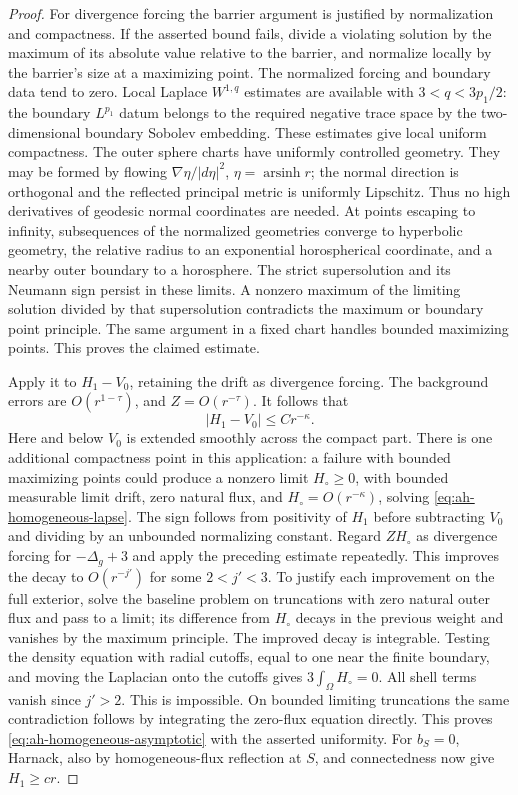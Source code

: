 \begin{proof}
For divergence forcing the barrier argument is justified by
normalization and compactness.  If the asserted bound fails,
divide a violating solution by the maximum of its absolute
value relative to the barrier, and normalize locally by the
barrier's size at a maximizing point.  The normalized forcing
and boundary data tend to zero.  Local Laplace \(W^{1,q}\)
estimates are available with
\(3<q<3p_1/2\): the boundary \(L^{p_1}\) datum belongs to the
required negative trace space by the two-dimensional boundary
Sobolev embedding.  These estimates give local uniform compactness.
The outer sphere charts have uniformly controlled geometry.
They may be formed by flowing
\(\nabla\eta/|d\eta|^2\), \(\eta=\operatorname{arsinh}r\);
the normal direction is orthogonal and the reflected principal
metric is uniformly Lipschitz.  Thus no high derivatives of
geodesic normal coordinates are needed.
At points escaping to infinity, subsequences of the normalized
geometries converge to hyperbolic geometry, the relative radius
to an exponential horospherical coordinate, and a nearby outer
boundary to a horosphere.  The strict supersolution and its
Neumann sign persist in these limits.  A nonzero maximum of the
limiting solution divided by that supersolution contradicts the
maximum or boundary point principle.  The same argument in a
fixed chart handles bounded maximizing points.  This proves the
claimed estimate.

Apply it to \(H_1-V_0\), retaining the drift as divergence forcing.
The background errors are \(O(r^{1-\tau})\), and
\(Z=O(r^{-\tau})\).  It follows that
\begin{equation}\label{eq:ah-homogeneous-asymptotic}
 |H_1-V_0|\le Cr^{-\kappa}.
\end{equation}
Here and below \(V_0\) is extended smoothly across the compact
part.  There is one additional compactness point in this
application: a failure with bounded maximizing points could
produce a nonzero limit \(H_\circ\ge0\), with bounded measurable
limit drift, zero natural flux, and
\(H_\circ=O(r^{-\kappa})\), solving
\eqref{eq:ah-homogeneous-lapse}.  The sign follows from positivity
of \(H_1\) before subtracting \(V_0\) and dividing by an unbounded
normalizing constant.  Regard \(ZH_\circ\) as divergence forcing
for \(-\Delta_g+3\) and apply the preceding estimate repeatedly.
This improves the decay to \(O(r^{-j'})\) for some \(2<j'<3\).
To justify each improvement on the full exterior, solve the
baseline problem on truncations with zero natural outer flux
and pass to a limit; its difference from \(H_\circ\) decays in
the previous weight and vanishes by the maximum principle.
The improved decay is integrable.  Testing the density equation
with radial cutoffs, equal to one near the finite boundary,
and moving the Laplacian onto the cutoffs gives
\(3\int_\Omega H_\circ=0\).  All shell terms vanish since
\(j'>2\).  This is impossible.  On bounded limiting truncations
the same contradiction follows by integrating the zero-flux
equation directly.  This proves
\eqref{eq:ah-homogeneous-asymptotic} with the asserted uniformity.
For \(b_S=0\), Harnack, also by homogeneous-flux reflection at
\(S\), and connectedness now give \(H_1\ge cr\).


\end{proof}
